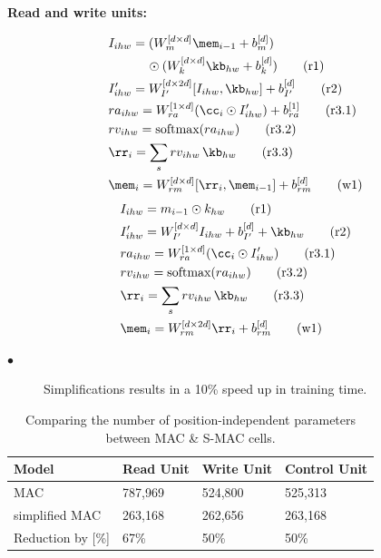 \documentclass[final,paperwidth=36in,paperheight=48in,portrait,fontscale=0.36]{baposter}
\begin{document}
\begin{poster}
{\noindent\textbf{Read and write units:}
\begin{multicols}{2}
	\noindent
	\begin{align*}
	&I_{ihw} = (W_{m}^{[d \times d]} \mem_{i-1} + b_{m}^{[d]}) \\
	& \qquad \quad \odot (W_{k}^{[d \times d]} \kb_{hw} + b_{k}^{[d]}) \tag{r1} \\
	&I'_{ihw} =  W_{I'}^{[d \times 2d]} [I_{ihw},\kb_{hw}]  + b_{I'}^{[d]}  \tag{r2} \\
	&ra_{ihw} = W_{ra}^{[1 \times d]} (\cc_i \odot I'_{ihw}) + b_{ra}^{[1]} \tag{r3.1}\\
	&rv_{ihw} = \textrm{softmax}(ra_{ihw}) \tag{r3.2}\\
	&\rr_i = \sum_s rv_{ihw} \, \kb_{hw}  \tag{r3.3}\\
	&\mem_i = W_{rm}^{[d \times d]} [\rr_i, \mem_{i-1}]  + b_{rm}^{[d]} \tag{w1}	
	\end{align*}
	\columnbreak
	{\color{Plum}
		\begin{align*}
		&I_{ihw} = m _{i-1} \odot k _{hw} \tag{r1} \\ 
		&I'_{ihw} = W_{I'}^{[d \times d]} I_{ihw} + b_{I'}^{[d]} + \kb_{hw} \tag{r2} \\
		&ra_{ihw} = W_{ra}^{[1 \times d]} (\cc_i \odot I'_{ihw})  \tag{r3.1}\\
		&rv_{ihw} = \textrm{softmax}(ra_{ihw}) \tag{r3.2}\\
		&\rr_i = \sum_s rv_{ihw} \, \kb_{hw}  \tag{r3.3}\\
		&\mem_i = W_{rm}^{[d \times 2d]} \rr_i + b_{rm}^{[d]} \tag{w1}
		\end{align*}}
\end{multicols}



\begin{description}
	
	\item[$\bullet$] Simplifications results in a 10\% speed up in training time.
	
\end{description}

	
\begin{table}[H]
	\centering
	\caption{Comparing the number of position-independent parameters between MAC \& S-MAC cells.}
	\begin{tabular}{llll}
		\toprule
		Model        & Read Unit               & Write Unit &  Control Unit         \\
		\midrule
		MAC   &  787,969 &  524,800        &    525,313    \\
		simplified MAC & 263,168  & 262,656       &    263,168 \\
		\midrule
		Reduction by [\%]  & 67\%  &   50\%       &      50\%  \\
		\bottomrule
	\end{tabular}
	\label{tab:data_properties}
\end{table}

}
\end{poster}
\end{document}
